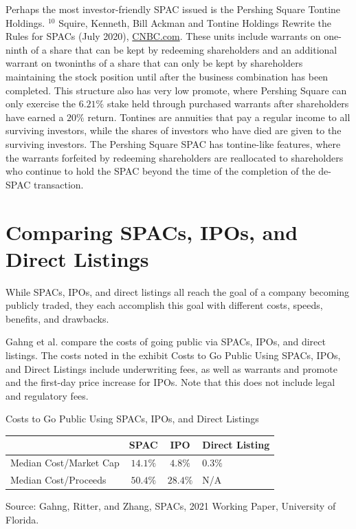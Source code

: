 \documentclass[11pt]{article}
\begin{document}
Perhaps the most investor-friendly SPAC issued is the Pershing Square Tontine Holdings. ${ }^{10}$ Squire, Kenneth, Bill Ackman and Tontine Holdings Rewrite the Rules for SPACs (July 2020), \href{http://CNBC.com}{CNBC.com}. These units include warrants on one-ninth of a share that can be kept by redeeming shareholders and an additional warrant on twoninths of a share that can only be kept by shareholders maintaining the stock position until after the business combination has been completed. This structure also has very low promote, where Pershing Square can only exercise the $6.21 \%$ stake held through purchased warrants after shareholders have earned a $20 \%$ return. Tontines are annuities that pay a regular income to all surviving investors, while the shares of investors who have died are given to the surviving investors. The Pershing Square SPAC has tontine-like features, where the warrants forfeited by redeeming shareholders are reallocated to shareholders who continue to hold the SPAC beyond the time of the completion of the de-SPAC transaction.

\section*{Comparing SPACs, IPOs, and Direct Listings}
While SPACs, IPOs, and direct listings all reach the goal of a company becoming publicly traded, they each accomplish this goal with different costs, speeds, benefits, and drawbacks.

Gahng et al. compare the costs of going public via SPACs, IPOs, and direct listings. The costs noted in the exhibit Costs to Go Public Using SPACs, IPOs, and Direct Listings include underwriting fees, as well as warrants and promote and the first-day price increase for IPOs. Note that this does not include legal and regulatory fees.

Costs to Go Public Using SPACs, IPOs, and Direct Listings

\begin{center}
\begin{tabular}{|l|c|c|l|}
\hline
 & SPAC & IPO & Direct Listing \\
\hline
Median Cost/Market Cap & $14.1 \%$ & $4.8 \%$ & $0.3 \%$ \\
\hline
Median Cost/Proceeds & $50.4 \%$ & $28.4 \%$ & N/A \\
\hline
\end{tabular}
\end{center}

Source: Gahng, Ritter, and Zhang, SPACs, 2021 Working Paper, University of Florida.
\end{document}
